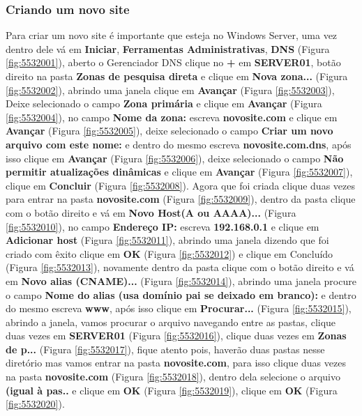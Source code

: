\documentclass[10pt]{article}
\begin{document}
\subsubsection{Criando um novo site} 
\par Para criar um novo site é importante que esteja no Windows Server, uma vez dentro dele vá em \textbf{Iniciar}, \textbf{Ferramentas Administrativas}, \textbf{DNS} (Figura \ref{fig:5532001}), aberto o Gerenciador DNS clique no \textbf{+} em \textbf{SERVER01}, botão direito na pasta \textbf{Zonas de pesquisa direta} e clique em \textbf{Nova zona...} (Figura \ref{fig:5532002}), abrindo uma janela clique em \textbf{Avançar} (Figura \ref{fig:5532003}), Deixe selecionado o campo \textbf{Zona primária} e clique em \textbf{Avançar} (Figura \ref{fig:5532004}), no campo \textbf{Nome da zona:} escreva \textbf{novosite.com} e clique em \textbf{Avançar} (Figura \ref{fig:5532005}), deixe selecionado o campo \textbf{Criar um novo arquivo com este nome:} e dentro do mesmo escreva \textbf{novosite.com.dns}, após isso clique em \textbf{Avançar} (Figura \ref{fig:5532006}), deixe selecionado o campo \textbf{Não permitir atualizações dinâmicas} e clique em \textbf{Avançar} (Figura \ref{fig:5532007}), clique em \textbf{Concluir} (Figura \ref{fig:5532008}). Agora que foi criada clique duas vezes para entrar na pasta \textbf{novosite.com} (Figura \ref{fig:5532009}), dentro da pasta clique com o botão direito e vá em \textbf{Novo Host(A ou AAAA)...} (Figura \ref{fig:5532010}), no campo \textbf{Endereço IP:} escreva \textbf{192.168.0.1} e clique em \textbf{Adicionar host} (Figura \ref{fig:5532011}), abrindo uma janela dizendo que foi criado com êxito clique em \textbf{OK} (Figura \ref{fig:5532012}) e clique em Concluído (Figura \ref{fig:5532013}), novamente dentro da pasta clique com o botão direito e vá em \textbf{Novo alias (CNAME)...} (Figura \ref{fig:5532014}), abrindo uma janela procure o campo \textbf{Nome do alias (usa domínio pai se deixado em branco):} e dentro do mesmo escreva \textbf{www}, após isso clique em \textbf{Procurar...} (Figura \ref{fig:5532015}), abrindo a janela, vamos procurar o arquivo navegando entre as pastas, clique duas vezes em \textbf{SERVER01} (Figura \ref{fig:5532016}), clique duas vezes em \textbf{Zonas de p...} (Figura \ref{fig:5532017}), fique atento pois, haverão duas pastas nesse diretório mas vamos entrar na pasta \textbf{novosite.com}, para isso clique duas vezes na pasta \textbf{novosite.com} (Figura \ref{fig:5532018}), dentro dela selecione o arquivo \textbf{(igual à pas..} e clique em \textbf{OK} (Figura \ref{fig:5532019}), clique em \textbf{OK} (Figura \ref{fig:5532020}).
\end{document}
